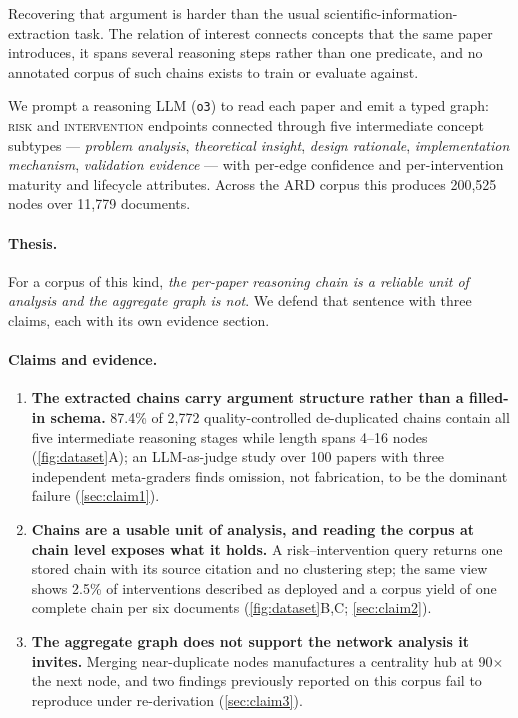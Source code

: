 \documentclass[10pt,twocolumn,letterpaper]{article}
\begin{document}
Recovering that argument is harder than the usual scientific-information-extraction
task. The relation of interest connects concepts that the same paper introduces,
it spans several reasoning steps rather than one predicate, and no annotated
corpus of such chains exists to train or evaluate against.

We prompt a reasoning LLM (\texttt{o3}) to read each paper and emit a typed
graph: \textsc{risk} and \textsc{intervention} endpoints connected through five
intermediate concept subtypes --- \emph{problem analysis}, \emph{theoretical
insight}, \emph{design rationale}, \emph{implementation mechanism},
\emph{validation evidence} --- with per-edge confidence and per-intervention
maturity and lifecycle attributes. Across the ARD corpus this produces 200{,}525
nodes over 11{,}779 documents.

\paragraph{Thesis.} For a corpus of this kind, \emph{the per-paper reasoning
chain is a reliable unit of analysis and the aggregate graph is not}. We defend
that sentence with three claims, each with its own evidence section.

\paragraph{Claims and evidence.}
\begin{enumerate}
\setlength{\itemsep}{2pt}
\item[\textbf{C1}] \textbf{The extracted chains carry argument structure rather
than a filled-in schema.} 87.4\% of 2{,}772 quality-controlled de-duplicated
chains contain all five intermediate reasoning stages while length spans 4--16
nodes (\cref{fig:dataset}A); an LLM-as-judge study over 100 papers with three
independent meta-graders finds omission, not fabrication, to be the dominant
failure (\cref{sec:claim1}).
\item[\textbf{C2}] \textbf{Chains are a usable unit of analysis, and reading the
corpus at chain level exposes what it holds.} A risk--intervention query returns
one stored chain with its source citation and no clustering step; the same view
shows 2.5\% of interventions described as deployed and a corpus yield of one
complete chain per six documents (\cref{fig:dataset}B,C; \cref{sec:claim2}).
\item[\textbf{C3}] \textbf{The aggregate graph does not support the network
analysis it invites.} Merging near-duplicate nodes manufactures a centrality hub
at 90$\times$ the next node, and two findings previously reported on this corpus
fail to reproduce under re-derivation (\cref{sec:claim3}).
\end{enumerate}
\end{document}
